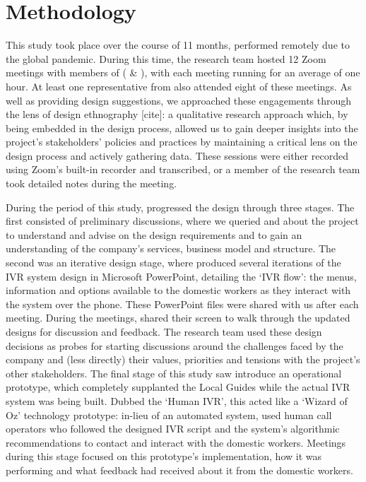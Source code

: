 \section{Methodology}

This study took place over the course of 11 months, performed remotely due to the global pandemic. During this time, the research team hosted 12 Zoom meetings with members of \PC{} (\PCOne{} \& \PCTwo{}), with each meeting running for an average of one hour. At least one representative from \NGO{} also attended eight of these meetings. As well as providing design suggestions, we approached these engagements through the lens of design ethnography [cite]: a qualitative research approach which, by being embedded in the design process, allowed us to gain deeper insights into the project's stakeholders' policies and practices by maintaining a critical lens on the design process and actively gathering data. These sessions were either recorded using Zoom's built-in recorder and transcribed, or a member of the research team took detailed notes during the meeting.

During the period of this study, \PC{} progressed the design through three stages. The first consisted of preliminary discussions, where we queried \PC{} and \NGO{} about the project to understand and advise on the design requirements and to gain an understanding of the company's services, business model and structure. The second was an iterative design stage, where \PCTwo{} produced several iterations of the IVR system design in Microsoft PowerPoint, detailing the `IVR flow': the menus, information and options available to the domestic workers as they interact with the system over the phone. These PowerPoint files were shared with us after each meeting. During the meetings, \PCTwo{} shared their screen to walk through the updated designs for discussion and feedback. The research team used these design decisions as probes for starting discussions around the challenges faced by the company and (less directly) their values, priorities and tensions with the project's other stakeholders. The final stage of this study saw \PC{} introduce an operational prototype, which completely supplanted the Local Guides while the actual IVR system was being built. Dubbed the `Human IVR', this acted like a `Wizard of Oz' technology prototype: in-lieu of an automated system, \PC{} used human call operators who followed the designed IVR script and the system's algorithmic recommendations to contact and interact with the domestic workers. Meetings during this stage focused on this prototype's implementation, how it was performing and what feedback \PC{} had received about it from the domestic workers.

